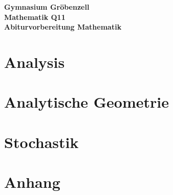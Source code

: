 \documentclass[a4paper]{report}
\begin{document}
\onehalfspacing
\begin{titlepage}

\begin{center}
\huge \textbf{Gymnasium Gröbenzell}
\vspace{0.2cm}\\
\Large \textbf{ Mathematik Q11}
\vspace{1cm}\\
\LARGE \textbf{Abiturvorbereitung Mathematik}
\vspace{1cm}\\
\end{center}
\end{titlepage}
\tableofcontents
\newpage
\chapter{Analysis}

\chapter{Analytische Geometrie}


\chapter{Stochastik}

\chapter{Anhang}

\printindex
\end{document}
